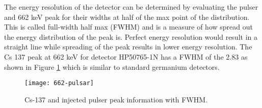 The energy resolution of the detector can be determined by evaluating the pulser and 662 keV peak for their widths at half of the max point of the distribution.
This is called full-width half max (FWHM) and is a measure of how spread out the energy distribution of the peak is.
Perfect energy resolution would result in a straight line while spreading of the peak results in lower energy resolution.
The Cs 137 peak at 662 keV for detector HP50765-1N has a FWHM of the 2.83 as shown in Figure \ref{fig:662-pulser} which is similar to standard germanium detectors.
\begin{figure}[htpb]
\centering
\texttt{[image: 662-pulsar]}
\caption{Cs-137 and injected pulser peak information with FWHM.}
\label{fig:662-pulser}
\end{figure}


